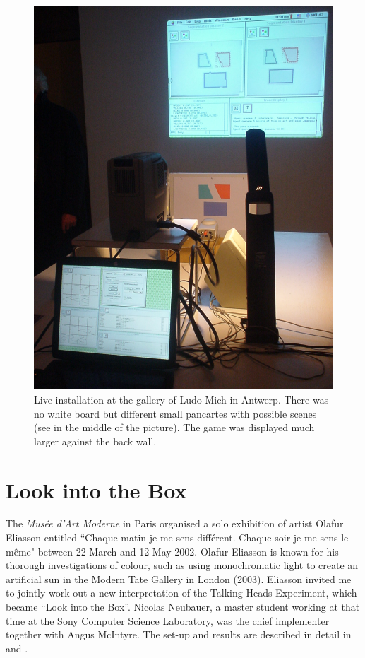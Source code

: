 \begin{figure}[htbp]
  \centerline{\includegraphics[width=.80\textwidth]{chap9/figs/mich-gallery.pdf}}
\caption{\label{fig:mich}Live installation at the gallery of Ludo Mich in Antwerp. There was no white board but different 
small pancartes with possible scenes (see in the middle of the picture). The game was displayed much larger against
the back wall.}
\end{figure}

\section{Look into the Box} 

The {\itshape Mus\'ee d'Art Moderne} in Paris organised a solo exhibition of artist Olafur Eliasson entitled 
``Chaque matin je me sens diff\'erent. Chaque soir je me sens le m\^eme" between 
22 March and 12 May 2002.\cite{Scherf:2002} Olafur Eliasson is known for his thorough 
investigations of colour, such as using monochromatic light to create an artificial sun in the Modern Tate
Gallery in London (2003). Eliasson invited me to jointly work out a new interpretation of the 
Talking Heads Experiment, which became ``Look into the Box''. Nicolas Neubauer, a master student working at 
that time at the Sony Computer Science Laboratory, was the chief implementer together with Angus McIntyre.  
The set-up and results are described in detail in \cite{Steels:2004} and \cite{Neubauer:2004}.

